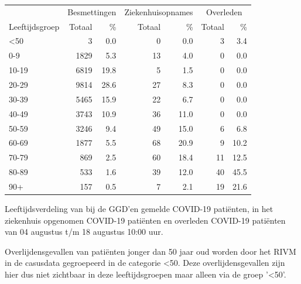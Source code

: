 \documentclass[
  english,
  man,floatsintext]{apa6}
\begin{document}
\begin{table}
\centering\begingroup\fontsize{11}{13}\selectfont

\begin{threeparttable}
\begin{tabular}{lrrrrrr}
\toprule
\multicolumn{1}{c}{ } & \multicolumn{2}{c}{Besmettingen} & \multicolumn{2}{c}{Ziekenhuisopnames} & \multicolumn{2}{c}{Overleden} \\
\cmidrule(l{3pt}r{3pt}){2-3} \cmidrule(l{3pt}r{3pt}){4-5} \cmidrule(l{3pt}r{3pt}){6-7}
Leeftijdsgroep & Totaal & \% & Totaal & \% & Totaal & \%\\
\midrule
<50 & 3 & 0.0 & 0 & 0.0 & 3 & 3.4\\
0-9 & 1829 & 5.3 & 13 & 4.0 & 0 & 0.0\\
10-19 & 6819 & 19.8 & 5 & 1.5 & 0 & 0.0\\
20-29 & 9814 & 28.6 & 27 & 8.3 & 0 & 0.0\\
30-39 & 5465 & 15.9 & 22 & 6.7 & 0 & 0.0\\
40-49 & 3743 & 10.9 & 36 & 11.0 & 0 & 0.0\\
50-59 & 3246 & 9.4 & 49 & 15.0 & 6 & 6.8\\
60-69 & 1877 & 5.5 & 68 & 20.9 & 9 & 10.2\\
70-79 & 869 & 2.5 & 60 & 18.4 & 11 & 12.5\\
80-89 & 533 & 1.6 & 39 & 12.0 & 40 & 45.5\\
90+ & 157 & 0.5 & 7 & 2.1 & 19 & 21.6\\
\bottomrule
\end{tabular}
\begin{tablenotes}
\item[1] Leeftijdsverdeling van bij de GGD’en gemelde COVID-19 patiënten, in het ziekenhuis opgenomen COVID-19 patiënten en overleden COVID-19 patiënten van 04 augustus t/m 18 augustus 10:00 uur.
\item[2] Overlijdensgevallen van patiënten jonger dan 50 jaar oud worden door het RIVM in de casusdata gegroepeerd in de categorie <50. Deze overlijdensgevallen zijn hier dus niet zichtbaar in deze leeftijdsgroepen maar alleen via de groep '<50'.
\end{tablenotes}
\end{threeparttable}
\endgroup{}
\end{table}

\newpage
\end{document}
